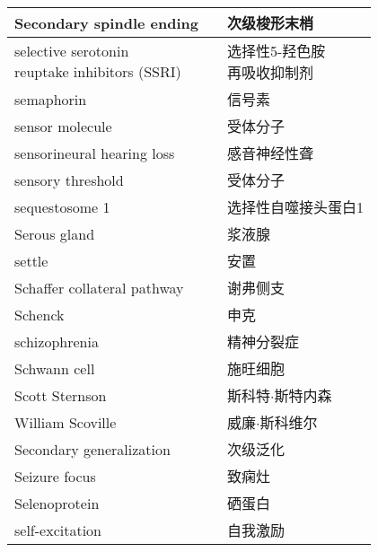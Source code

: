 \begin{longtable}{lll}
	\midrule
	Secondary spindle ending   && 次级梭形末梢 \\
	
	\midrule
	\makecell[l]{selective serotonin \\reuptake inhibitors (SSRI)}   && \makecell[l]{选择性5-羟色胺\\再吸收抑制剂} \\
	
	\midrule
	semaphorin   && 信号素 \\
	
	\midrule
	sensor molecule   && 受体分子 \\
	
	\midrule
	sensorineural hearing loss   && 感音神经性聋 \\
	
	\midrule
	sensory threshold   && 受体分子 \\
	
	\midrule
	sequestosome 1   && 选择性自噬接头蛋白1	 \\
	
	\midrule
	Serous gland   && 浆液腺	 \\
	
	\midrule
	settle   && 安置	 \\
	
	\midrule
	Schaffer collateral pathway   && 谢弗侧支 \\
	
	\midrule
	Schenck   && 申克 \\
	
	\midrule
	schizophrenia   && 精神分裂症 \\
	
	\midrule
	Schwann cell   && 施旺细胞 \\
	
	\midrule
	Scott Sternson   && 斯科特$\cdot$斯特内森 \\
	
	\midrule
	William Scoville   && 威廉$\cdot$斯科维尔 \\
	
	\midrule
	Secondary generalization   && 次级泛化 \\
	
	\midrule
	Seizure focus   && 致痫灶 \\
	
	\midrule
	Selenoprotein   && 硒蛋白 \\
	
	\midrule
	self-excitation   && 自我激励 \\
	

\end{longtable}
